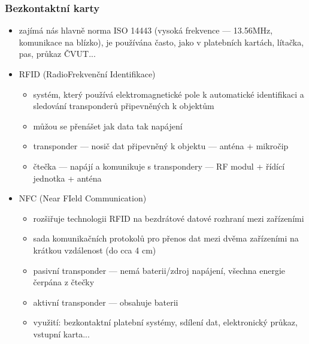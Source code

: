 \subsubsection*{Bezkontaktní karty}
\begin{itemize}
	\item zajímá nás hlavně norma ISO 14443 (vysoká frekvence --- 13.56MHz, komunikace na blízko), je používána často, jako v platebních kartách, lítačka, pas, průkaz ČVUT...
	\item RFID (RadioFrekvenční Identifikace)
	\begin{itemize}
		\item systém, který používá elektromagnetické pole k automatické identifikaci a sledování transponderů připevněných k objektům
		\item můžou se přenášet jak data tak napájení
		\item transponder --- nosič dat připevněný k objektu --- anténa + mikročip
		\item čtečka --- napájí a komunikuje s transpondery --- RF modul + řídící jednotka + anténa
	\end{itemize}
	\item NFC (Near FIeld Communication)
	\begin{itemize}
		\item rozšiřuje technologii RFID na bezdrátové datové rozhraní mezi zařízeními
		\item sada komunikačních protokolů pro přenos dat mezi dvěma zařízeními na krátkou vzdálenost (do cca 4 cm)
		\item pasivní transponder --- nemá baterii/zdroj napájení, všechna energie čerpána z čtečky
		\item aktivní transponder --- obsahuje baterii
		\item využití: bezkontaktní platební systémy, sdílení dat, elektronický průkaz, vstupní karta...
	\end{itemize}		 
\end{itemize}